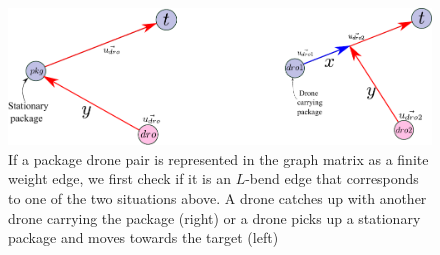 \documentclass[10pt, english, oneside]{report}
\begin{document}
\begin{figure}[H]
\centering
\includegraphics[width=18cm]{docs/lbend.pdf}
\caption{If a package drone pair is represented in the graph matrix as a finite weight edge, we first 
check if it is an $L$-bend edge that corresponds to one of the two situations above. A drone catches
up with another drone carrying the package (right) or a drone picks up a stationary package and moves
towards the target (left)}
\end{figure}
\end{document}
